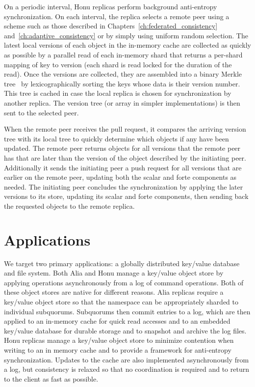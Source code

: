 On a periodic interval, Honu replicas perform background anti-entropy synchronization.
On each interval, the replica selects a remote peer using a scheme such as those described in Chapters~\ref{ch:federated_consistency} and~\ref{ch:adaptive_consistency} or by simply using uniform random selection.
The latest local versions of each object in the in-memory cache are collected as quickly as possible by a parallel read of each in-memory shard that returns a per-shard mapping of key to version (each shard is read locked for the duration of the read).
Once the versions are collected, they are assembled into a binary Merkle tree~\cite{merkle_tree} by lexicographically sorting the keys whose data is their version number.
This tree is cached in case the local replica is chosen for synchronization by another replica.
The version tree (or array in simpler implementations) is then sent to the selected peer.

When the remote peer receives the pull request, it compares the arriving version tree with its local tree to quickly determine which objects if any have been updated.
The remote peer returns objects for all versions that the remote peer has that are later than the version of the object described by the initiating peer.
Additionally it sends the initiating peer a push request for all versions that are earlier on the remote peer, updating both the scalar and forte components as needed.
The initiating peer concludes the synchronization by applying the later versions to its store, updating its scalar and forte components, then sending back the requested objects to the remote replica.

\section{Applications}
\label{ch05_applications}

We target two primary applications: a globally distributed key/value database and file system.
Both Alia and Honu manage a key/value object store by applying operations asynchronously from a log of command operations.
Both of these object stores are native for different reasons.
Alia replicas require a key/value object store so that the namespace can be appropriately sharded to individual subquorums.
Subquorums then commit entries to a log, which are then applied to an in-memory cache for quick read accesses and to an embedded key/value database for durable storage and to snapshot and archive the log files.
Honu replicas manage a key/value object store to minimize contention when writing to an in memory cache and to provide a framework for anti-entropy synchronization.
Updates to the cache are also implemented asynchronously from a log, but consistency is relaxed so that no coordination is required and to return to the client as fast as possible.

